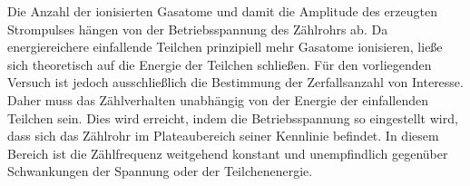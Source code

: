 Die Anzahl der ionisierten Gasatome und damit die Amplitude des erzeugten Strompulses hängen von der Betriebsspannung des Zählrohrs ab. Da energiereichere einfallende Teilchen prinzipiell mehr Gasatome ionisieren, ließe sich theoretisch auf die Energie der Teilchen schließen. Für den vorliegenden Versuch ist jedoch ausschließlich die Bestimmung der Zerfallsanzahl von Interesse. Daher muss das Zählverhalten unabhängig von der Energie der einfallenden Teilchen sein. Dies wird erreicht, indem die Betriebsspannung so eingestellt wird, dass sich das Zählrohr im Plateaubereich seiner Kennlinie befindet. In diesem Bereich ist die Zählfrequenz weitgehend konstant und unempfindlich gegenüber Schwankungen der Spannung oder der Teilchenenergie.
\newpage


